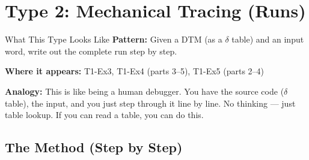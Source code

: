 \documentclass[11pt,a4paper]{article}
\begin{document}
\section{Type 2: Mechanical Tracing (Runs)}

\begin{notebox}{What This Type Looks Like}
\textbf{Pattern:} Given a DTM (as a $\delta$ table) and an input word, write out the complete run step by step.

\textbf{Where it appears:} T1-Ex3, T1-Ex4 (parts 3--5), T1-Ex5 (parts 2--4)

\textbf{Analogy:} This is like being a human debugger. You have the source code ($\delta$ table), the input, and you just step through it line by line. No thinking --- just table lookup. If you can read a table, you can do this.
\end{notebox}

\subsection{The Method (Step by Step)}
\end{document}
